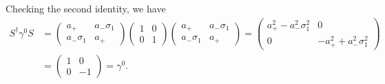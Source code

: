 Checking the second identity, we have
\begin{align}
    \label{eq:Sdagger-gamma0-S}
    S^{\dagger} \gamma^{0} S &= 
    \begin{pmatrix}
        a_{+} & a_{-} \sigma_1 \\
        a_{-} \sigma_1 & a_{+}
    \end{pmatrix}
    \begin{pmatrix}
        1 & 0 \\
        0 & 1
    \end{pmatrix}
    \begin{pmatrix}
        a_{+} & a_{-} \sigma_1 \\
        a_{-} \sigma_1 & a_{+}
    \end{pmatrix}
    =
    \begin{pmatrix}
    a_{+}^2 - a_{-}^2\sigma_1^2 & 0 \\
    0 & -a_{+}^2 + a_{-}^2\sigma_1^2
    \end{pmatrix} \\
                             &= 
                             \begin{pmatrix}
                             1 & 0 \\
                             0 & -1
                             \end{pmatrix}
                             =  
                             \gamma^{0}
.\end{align}




